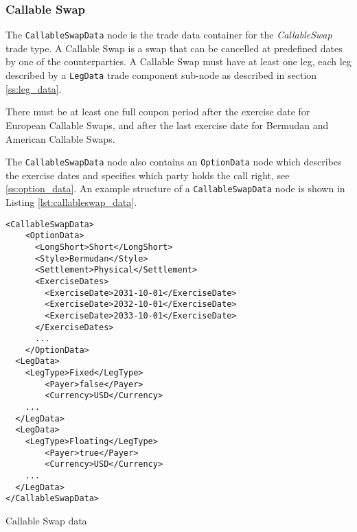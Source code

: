 \subsubsection{Callable Swap}\label{ss:callable_swap}

\ifdefined{}\fi

The \lstinline!CallableSwapData! node is the trade data container for the \emph{CallableSwap} trade type. A Callable Swap is a
 swap that can be cancelled at predefined dates by one of the counterparties. A Callable Swap must have at least one leg, each leg described by a \lstinline!LegData! trade component sub-node as described in section
\ref{ss:leg_data}.  

There must be at least one full coupon period after the exercise date for European Callable Swaps, and after the last exercise date for Bermudan and American Callable Swaps. 

The \lstinline!CallableSwapData! node also contains an \lstinline!OptionData! node which describes
the exercise dates and specifies which party holds the call right, see \ref{ss:option_data}. An example structure of a
\lstinline!CallableSwapData! node is shown in Listing \ref{lst:callableswap_data}.

\begin{listing}[H]
\begin{verbatim}
<CallableSwapData>
    <OptionData>
      <LongShort>Short</LongShort>
      <Style>Bermudan</Style>
      <Settlement>Physical</Settlement>
      <ExerciseDates>
        <ExerciseDate>2031-10-01</ExerciseDate>
        <ExerciseDate>2032-10-01</ExerciseDate>
        <ExerciseDate>2033-10-01</ExerciseDate>
      </ExerciseDates>
      ...
    </OptionData>
  <LegData>
	<LegType>Fixed</LegType>
        <Payer>false</Payer>    
        <Currency>USD</Currency>	
	...
  </LegData>
  <LegData>
	<LegType>Floating</LegType>
        <Payer>true</Payer>     
        <Currency>USD</Currency>	
	...
  </LegData>
</CallableSwapData>
\end{verbatim}
\caption{Callable Swap data}
\label{lst:callableswap_data}
\end{listing}



